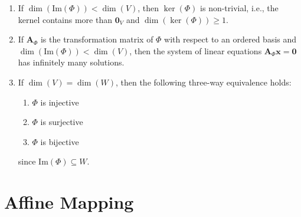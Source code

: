 \begin{enumerate}
\begin{enumerate}
        \item If $\dim(\text{Im}(\Phi )) < \dim(V )$, then $\ker(\Phi)$ is non-trivial, i.e., the kernel contains more than $\bm{0}_V$ and $\dim(\ker(\Phi)) \geq 1$.
        \hfill \cite{mfml/book/mml/Deisenroth-Faisal-Ong}

        \item If $\bm{A}_\Phi $ is the transformation matrix of $\Phi$  with respect to an ordered basis and $\dim(\text{Im}(\Phi )) < \dim(V )$, then the system of linear equations $\bm{A}_\Phi \bm{x} = \bm{0}$ has infinitely many solutions.
        \hfill \cite{mfml/book/mml/Deisenroth-Faisal-Ong}

        \item If $\dim(V ) = \dim(W)$, then the following three-way equivalence holds:
        \begin{enumerate}
            \item $\Phi$ is injective
            \item $\Phi$ is surjective
            \item $\Phi$ is bijective
        \end{enumerate}
        since $\text{Im}(\Phi) \subseteq W$.
    \end{enumerate}
\end{enumerate}













\section{Affine Mapping}

